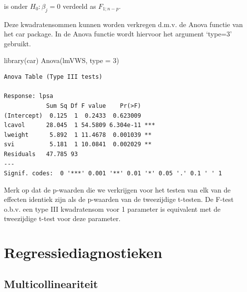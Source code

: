 \documentclass[
  dutch,
  letterpaper,
  12pt]{book}
\newenvironment{Shaded}{\begin{snugshade}}{\end{snugshade}}
\newcommand{\AttributeTok}[1]{\textcolor[rgb]{0.40,0.45,0.13}{#1}}
\newcommand{\DecValTok}[1]{\textcolor[rgb]{0.68,0.00,0.00}{#1}}
\newcommand{\FunctionTok}[1]{\textcolor[rgb]{0.28,0.35,0.67}{#1}}
\newcommand{\NormalTok}[1]{\textcolor[rgb]{0.00,0.23,0.31}{#1}}
\theoremstyle{definition}
\theoremstyle{definition}
\theoremstyle{definition}
\theoremstyle{remark}
\begin{document}
is onder \(H_0:\beta_j=0\) verdeeld as \(F_{1;n-p}\).

Deze kwadratensommen kunnen worden verkregen d.m.v. de Anova functie van
het car package. In de Anova functie wordt hiervoor het argument
`type=3' gebruikt.

\begin{Shaded}
\begin{Highlighting}[]
\FunctionTok{library}\NormalTok{(car)}
\FunctionTok{Anova}\NormalTok{(lmVWS, }\AttributeTok{type =} \DecValTok{3}\NormalTok{)}
\end{Highlighting}
\end{Shaded}

\begin{verbatim}
Anova Table (Type III tests)

Response: lpsa
            Sum Sq Df F value    Pr(>F)    
(Intercept)  0.125  1  0.2433  0.623009    
lcavol      28.045  1 54.5809 6.304e-11 ***
lweight      5.892  1 11.4678  0.001039 ** 
svi          5.181  1 10.0841  0.002029 ** 
Residuals   47.785 93                      
---
Signif. codes:  0 '***' 0.001 '**' 0.01 '*' 0.05 '.' 0.1 ' ' 1
\end{verbatim}

Merk op dat de p-waarden die we verkrijgen voor het testen van elk van
de effecten identiek zijn als de p-waarden van de tweezijdige t-testen.
De F-test o.b.v. een type III kwadratensom voor 1 parameter is
equivalent met de tweezijdige t-test voor deze parameter.

\section{Regressiediagnostieken}\label{regressiediagnostieken}

\subsection{Multicollineariteit}\label{multicollineariteit}
\end{document}
